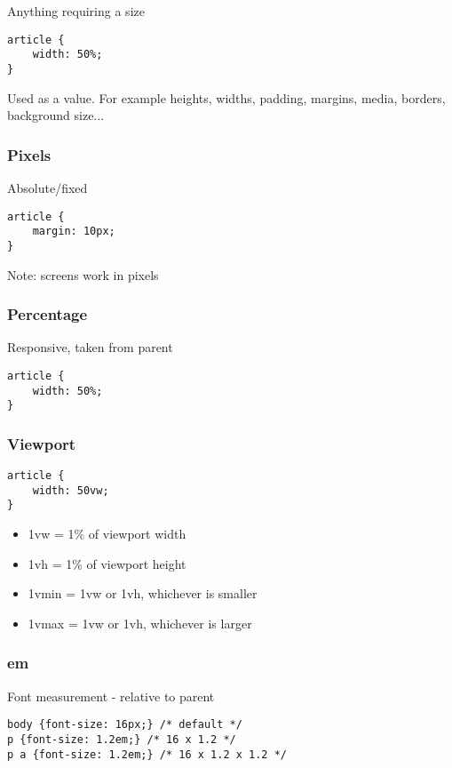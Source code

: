 Anything requiring a size


\begin{verbatim}
article {
	width: 50%;
}
\end{verbatim}

Used as a value. For example heights, widths, padding, margins, media, borders, background size...

\subsubsection{Pixels}

Absolute/fixed

\begin{verbatim}
article {
	margin: 10px;
}
\end{verbatim}

Note: screens work in pixels

\subsubsection{Percentage}

Responsive, taken from parent

\begin{verbatim}
article {
	width: 50%;
}
\end{verbatim}

\subsubsection{Viewport}

\begin{verbatim}
article {
	width: 50vw;
}
\end{verbatim}

\begin{itemize}
    \item 1vw = 1\% of viewport width
    \item 1vh = 1\% of viewport height
    \item 1vmin = 1vw or 1vh, whichever is smaller
    \item 1vmax = 1vw or 1vh, whichever is larger
\end{itemize}


\subsubsection{em}

Font measurement - relative to parent

\begin{verbatim}
body {font-size: 16px;} /* default */
p {font-size: 1.2em;} /* 16 x 1.2 */
p a {font-size: 1.2em;} /* 16 x 1.2 x 1.2 */
\end{verbatim}

